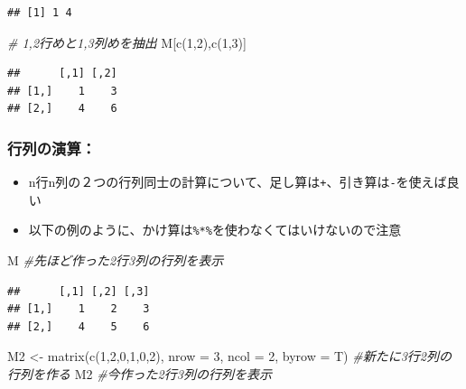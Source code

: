 \documentclass[
]{book}
\newenvironment{Shaded}{\begin{snugshade}}{\end{snugshade}}
\newcommand{\AttributeTok}[1]{\textcolor[rgb]{0.77,0.63,0.00}{#1}}
\newcommand{\CommentTok}[1]{\textcolor[rgb]{0.56,0.35,0.01}{\textit{#1}}}
\newcommand{\DecValTok}[1]{\textcolor[rgb]{0.00,0.00,0.81}{#1}}
\newcommand{\FunctionTok}[1]{\textcolor[rgb]{0.00,0.00,0.00}{#1}}
\newcommand{\NormalTok}[1]{#1}
\newcommand{\OtherTok}[1]{\textcolor[rgb]{0.56,0.35,0.01}{#1}}
\providecommand{\tightlist}{%
  \setlength{\itemsep}{0pt}\setlength{\parskip}{0pt}}
\begin{document}
\begin{verbatim}
## [1] 1 4
\end{verbatim}

\begin{Shaded}
\begin{Highlighting}[]
\CommentTok{\# 1,2行めと1,3列めを抽出}
\NormalTok{M[}\FunctionTok{c}\NormalTok{(}\DecValTok{1}\NormalTok{,}\DecValTok{2}\NormalTok{),}\FunctionTok{c}\NormalTok{(}\DecValTok{1}\NormalTok{,}\DecValTok{3}\NormalTok{)]}
\end{Highlighting}
\end{Shaded}

\begin{verbatim}
##      [,1] [,2]
## [1,]    1    3
## [2,]    4    6
\end{verbatim}

\hypertarget{ux884cux5217ux306eux6f14ux7b97}{%
\subsubsection*{行列の演算：}\label{ux884cux5217ux306eux6f14ux7b97}}

\begin{itemize}
\tightlist
\item
  n行n列の２つの行列同士の計算について、足し算は\texttt{+}、引き算は\texttt{-}を使えば良い
\item
  以下の例のように、かけ算は\texttt{\%*\%}を使わなくてはいけないので注意
\end{itemize}

\begin{Shaded}
\begin{Highlighting}[]
\NormalTok{M }\CommentTok{\#先ほど作った2行3列の行列を表示}
\end{Highlighting}
\end{Shaded}

\begin{verbatim}
##      [,1] [,2] [,3]
## [1,]    1    2    3
## [2,]    4    5    6
\end{verbatim}

\begin{Shaded}
\begin{Highlighting}[]
\NormalTok{M2 }\OtherTok{\textless{}{-}} \FunctionTok{matrix}\NormalTok{(}\FunctionTok{c}\NormalTok{(}\DecValTok{1}\NormalTok{,}\DecValTok{2}\NormalTok{,}\DecValTok{0}\NormalTok{,}\DecValTok{1}\NormalTok{,}\DecValTok{0}\NormalTok{,}\DecValTok{2}\NormalTok{), }\AttributeTok{nrow =} \DecValTok{3}\NormalTok{, }\AttributeTok{ncol =} \DecValTok{2}\NormalTok{, }\AttributeTok{byrow =}\NormalTok{ T) }\CommentTok{\#新たに3行2列の行列を作る}
\NormalTok{M2 }\CommentTok{\#今作った2行3列の行列を表示}
\end{Highlighting}
\end{Shaded}
\end{document}
